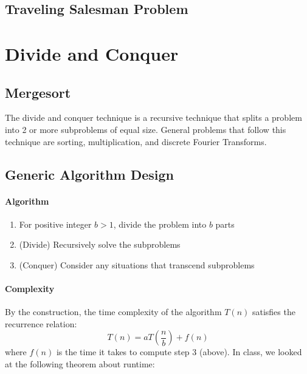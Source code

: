 \documentclass[11pt]{article}
\theoremstyle{plain}
\theoremstyle{definition}
\numberwithin{equation}{section}
\numberwithin{figure}{section}
\begin{document}
\subsection{Traveling Salesman Problem}

\newpage
\section{Divide and Conquer}

\subsection{Mergesort}

The divide and conquer technique is a recursive technique that splits a problem into 2 or more subproblems of equal size. General problems that follow this technique are sorting, multiplication, and discrete Fourier Transforms.

\subsection{Generic Algorithm Design}
\paragraph{Algorithm}
\begin{enumerate}
\item For positive integer $b > 1$, divide the problem into $b$ parts
\item (Divide) Recursively solve the subproblems
\item (Conquer) Consider any situations that transcend subproblems
\end{enumerate}

\paragraph{Complexity} By the construction, the time complexity of the algorithm $T(n)$ satisfies the recurrence relation: 
\begin{equation}
T(n) = a T\left(\frac{n}{b}\right) + f(n)
\end{equation}
where $f(n)$ is the time it takes to compute step 3 (above). In class, we looked at the following theorem about runtime:
\end{document}
